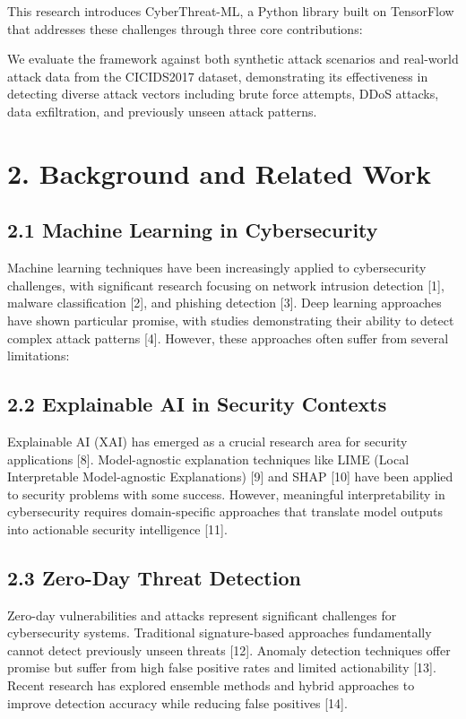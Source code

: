 \documentclass[12pt]{article}
\begin{document}
This research introduces CyberThreat-ML, a Python library built on TensorFlow that addresses these challenges through three core contributions:

We evaluate the framework against both synthetic attack scenarios and real-world attack data from the CICIDS2017 dataset, demonstrating its effectiveness in detecting diverse attack vectors including brute force attempts, DDoS attacks, data exfiltration, and previously unseen attack patterns.

\section{2. Background and Related Work}
\subsection{2.1 Machine Learning in Cybersecurity}
Machine learning techniques have been increasingly applied to cybersecurity challenges, with significant research focusing on network intrusion detection [1], malware classification [2], and phishing detection [3]. Deep learning approaches have shown particular promise, with studies demonstrating their ability to detect complex attack patterns [4]. However, these approaches often suffer from several limitations:

\subsection{2.2 Explainable AI in Security Contexts}
Explainable AI (XAI) has emerged as a crucial research area for security applications [8]. Model-agnostic explanation techniques like LIME (Local Interpretable Model-agnostic Explanations) [9] and SHAP [10] have been applied to security problems with some success. However, meaningful interpretability in cybersecurity requires domain-specific approaches that translate model outputs into actionable security intelligence [11].

\subsection{2.3 Zero-Day Threat Detection}
Zero-day vulnerabilities and attacks represent significant challenges for cybersecurity systems. Traditional signature-based approaches fundamentally cannot detect previously unseen threats [12]. Anomaly detection techniques offer promise but suffer from high false positive rates and limited actionability [13]. Recent research has explored ensemble methods and hybrid approaches to improve detection accuracy while reducing false positives [14].
\end{document}
